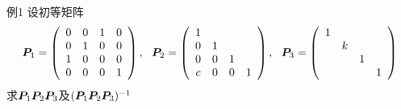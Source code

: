 \begin{li}{例1}
  设初等矩阵
  $$
  \boldsymbol{P}_1 = \left(
    \begin{array}{cccc}
      0&0&1&0 \\
      0&1&0&0 \\
      1&0&0&0 \\
      0&0&0&1
    \end{array}
  \right), ~~
  \boldsymbol{P}_2 = \left(
    \begin{array}{cccc}
      1& & &  \\
      0&1& &  \\
      0&0&1& \\
      c&0&0&1
    \end{array}
  \right), ~~
  \boldsymbol{P}_3 = \left(
    \begin{array}{cccc}
      1& & &  \\
       &k& &  \\
       & &1& \\
       & & &1
    \end{array}
  \right)
  $$
  求$\boldsymbol{P}_1\boldsymbol{P}_2\boldsymbol{P}_3$及$(\boldsymbol{P}_1\boldsymbol{P}_2\boldsymbol{P}_3)^{-1}$
\end{li}

